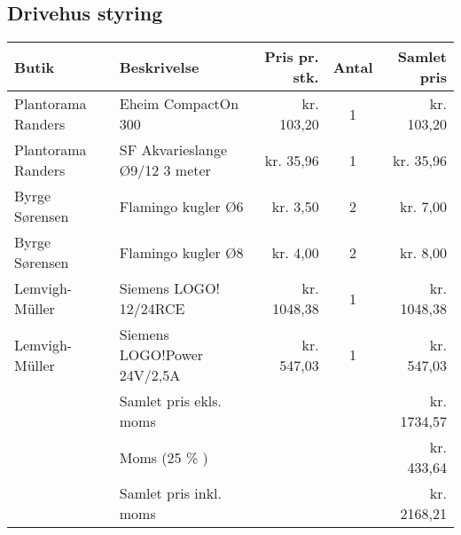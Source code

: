 \subsection{Drivehus styring}
\begin{tabular}[c]{|l|l|r|c|r|}
    \hline
    Butik & Beskrivelse & Pris pr. stk. & Antal & Samlet pris \\
    \hline \hline
    Plantorama Randers & Eheim CompactOn 300 &  kr. 103,20 & 1 & kr. 103,20 \\
    \hline
    Plantorama Randers & SF Akvarieslange Ø9/12 3 meter & kr. 35,96 & 1 & kr. 35,96 \\
    \hline
    Byrge Sørensen & Flamingo kugler Ø6 & kr. 3,50  & 2 & kr. 7,00 \\
    \hline
    Byrge Sørensen & Flamingo kugler Ø8 & kr. 4,00 & 2 & kr. 8,00 \\
    \hline
    Lemvigh-Müller & Siemens LOGO! 12/24RCE & kr. 1048,38 & 1 & kr. 1048,38 \\
    \hline
    Lemvigh-Müller & Siemens LOGO!Power 24V/2,5A &  kr. 547,03 & 1 & kr. 547,03 \\
    \hline
                    & Samlet pris ekls. moms &  & & kr. 1734,57 \\
                    & Moms (25 \% ) & & & kr. 433,64 \\
                    & Samlet pris inkl. moms & & & kr. 2168,21 \\
                    \hline

\end{tabular}
